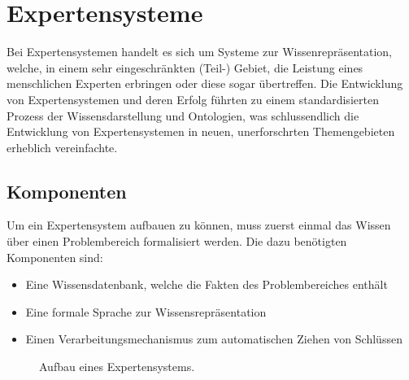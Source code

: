 \chapter{Expertensysteme}
\label{chap:experten_systeme}

Bei Expertensystemen handelt es sich um Systeme zur Wissenrepräsentation, welche, in einem sehr eingeschränkten (Teil-) Gebiet, die Leistung eines menschlichen Experten erbringen oder diese sogar übertreffen. Die Entwicklung von Expertensystemen und deren Erfolg führten zu einem standardisierten Prozess der Wissensdarstellung und Ontologien, was schlussendlich die Entwicklung von Expertensystemen in neuen, unerforschrten Themengebieten erheblich vereinfachte.~\cite[S. 257]{russel}

\section{Komponenten}
\label{sec:experten_systeme_komponenten}
Um ein Expertensystem aufbauen zu können, muss zuerst einmal das Wissen über einen Problembereich formalisiert werden. Die dazu benötigten Komponenten sind:
\begin{itemize}
    \item Eine Wissensdatenbank, welche die Fakten des Problembereiches enthält
    \item Eine formale Sprache zur Wissensrepräsentation
    \item Einen Verarbeitungsmechanismus zum automatischen Ziehen von Schlüssen
\end{itemize}

\begin{figure}[htbp]
\centering {}
\caption{Aufbau eines Expertensystems.\label{fig:aufbau_expertensysteme}\protect\footnotemark}
\end{figure}

